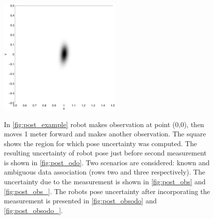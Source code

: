 \begin{figure}
\begin{center}
{\includegraphics[width=6cm]{Pics/post_obsodo}
\label{fig:post_obsodo}
}\\
\quad\space
{}
\end{center}
\caption[Robot pose uncertainty, example]{In \ref{fig:post_example}
robot makes observation at point (0,0), then moves 1 meter forward and
makes another observation. The square shows the region for which pose
uncertainty was computed. The resulting uncertainty of robot pose just
before second measurement is shown in \ref{fig:post_odo}. Two scenarios
are considered: known and ambiguous data association (rows two and three
respectively).  The uncertainty due to the measurement is shown in
\ref{fig:post_obs} and \ref{fig:post_obs_}. The robots pose uncertainty
after incorporating the measurement is presented in
\ref{fig:post_obsodo} and \ref{fig:post_obsodo_}.}\label{fig:post_all}
\end{figure}

